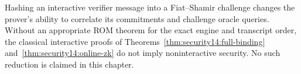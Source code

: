 \begin{remark}
Hashing an interactive
verifier message into a
Fiat--Shamir challenge
changes the prover's
ability to correlate
its commitments and
challenge oracle
queries. Without an
appropriate ROM theorem
for the exact engine
and transcript order,
the classical interactive
proofs of
Theorems~\ref{thm:security14:full-binding}
and~\ref{thm:security14:online-zk}
do not imply
noninteractive security.
No such reduction is
claimed in this chapter.
\end{remark}
